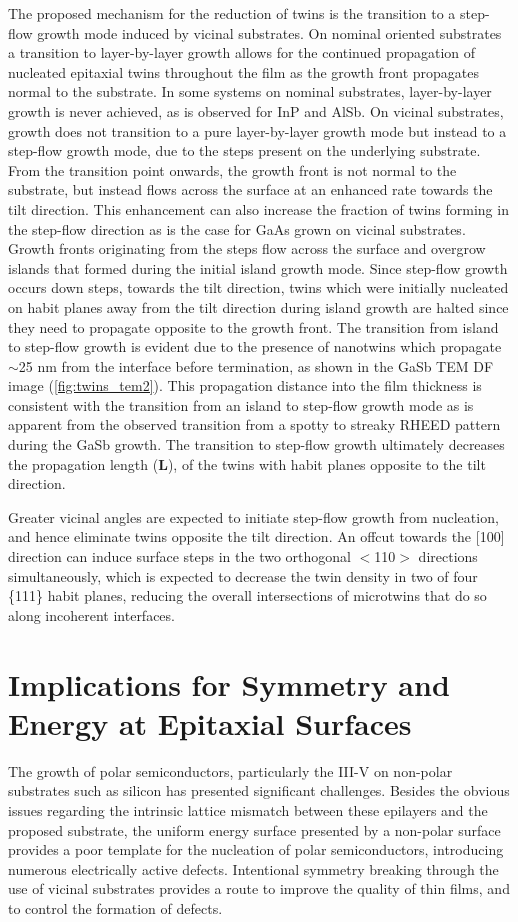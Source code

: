The proposed mechanism for the reduction of twins is the transition to a step-flow growth mode induced by vicinal substrates.
On nominal oriented substrates a transition to layer-by-layer growth allows for the continued propagation of nucleated epitaxial twins throughout the film as the growth front propagates normal to the substrate.
In some systems on nominal substrates, layer-by-layer growth is never achieved, as is observed for InP and AlSb.
On vicinal substrates, growth does not transition to a pure layer-by-layer growth mode but instead to a step-flow growth mode, due to the steps present on the underlying substrate.
From the transition point onwards, the growth front is not normal to the substrate, but instead flows across the surface at an enhanced rate towards the tilt direction.
This enhancement can also increase the fraction of twins forming in the step-flow direction as is the case for GaAs grown on vicinal substrates.
Growth fronts originating from the steps flow across the surface and overgrow islands that formed during the initial island growth mode.
Since step-flow growth occurs down steps, towards the tilt direction, twins which were initially nucleated on habit planes away from the tilt direction during island growth are halted since they need to propagate opposite to the growth front.
The transition from island to step-flow growth is evident due to the presence of nanotwins which propagate \(\sim\)25 nm from the interface before termination, as shown in the GaSb TEM DF image (\cref{fig:twins_tem2}).
This propagation distance into the film thickness is consistent with the transition from an island to step-flow growth mode as is apparent from the observed transition from a spotty to streaky RHEED pattern during the GaSb growth.
The transition to step-flow growth ultimately decreases the propagation length (\textbf{L}), of the twins with habit planes opposite to the tilt direction.

Greater vicinal angles are expected to initiate step-flow growth from nucleation, and hence eliminate twins opposite the tilt direction.
An offcut towards the [100] direction can induce surface steps in the two orthogonal \(<\)110\(>\) directions simultaneously\cite{Fang1990}, which is expected to decrease the twin density in two of four \{111\} habit planes, reducing the overall intersections of microtwins that do so along incoherent interfaces.
\section{Implications for Symmetry and Energy at Epitaxial Surfaces}
The growth of polar semiconductors, particularly the III-V on non-polar substrates such as silicon has presented significant challenges.
Besides the obvious issues regarding the intrinsic lattice mismatch between these epilayers and the proposed substrate, the uniform energy surface presented by a non-polar surface provides a poor template for the nucleation of polar semiconductors, introducing numerous electrically active defects.
Intentional symmetry breaking through the use of vicinal substrates provides a route to improve the quality of thin films, and to control the formation of defects.

